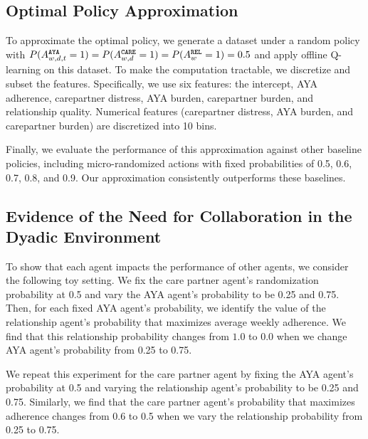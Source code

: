\subsection{Optimal Policy Approximation}
\label{sec:optpol}


To approximate the optimal policy, we generate a dataset under a random policy with $P(A_{w,d,t}^{\tiny\texttt{AYA}}=1)= P(A_{w,d}^{\tiny\texttt{CARE}}=1) = P(A_w^{\tiny\texttt{REL}}=1)=0.5$ and apply offline Q-learning on this dataset. To make the computation tractable, we discretize and subset the features. Specifically, we use six features: the intercept, AYA adherence, carepartner distress, AYA burden, carepartner burden, and relationship quality. Numerical features (carepartner distress, AYA burden, and carepartner burden) are discretized into 10 bins.

Finally, we evaluate the performance of this approximation against other baseline policies, including micro-randomized actions with fixed probabilities of 0.5, 0.6, 0.7, 0.8, and 0.9. Our approximation consistently outperforms these baselines.


\subsection{Evidence of the Need for Collaboration in the Dyadic Environment}
\label{app:evidence-collab}

To show that each agent impacts the performance of other agents, we consider the following toy setting.
We fix the care partner agent's randomization probability at 0.5 and vary the AYA agent’s probability to be 0.25 and 0.75. Then, for each fixed AYA agent's probability, we identify the value of the relationship agent’s probability that maximizes average weekly adherence. We find that this relationship probability changes from $1.0$ to $0.0$ when we change AYA agent's probability from 0.25 to 0.75. 

We repeat this experiment for the care partner agent by fixing the AYA agent’s probability at 0.5 and varying the relationship agent’s probability to be 0.25 and 0.75. Similarly, we find that the care partner agent's probability that maximizes adherence changes from 0.6 to 0.5 when we vary the relationship probability from 0.25 to 0.75.

